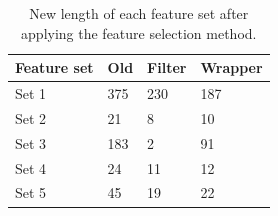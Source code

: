 \documentclass[USenglish]{ifimaster}  %
\begin{document}
\begin{table}[h]
	\centering
	\begin{tabular}{llll}
		\hline
		\textbf{Feature set} & \textbf{Old} & \textbf{Filter} & \textbf{Wrapper} \\ \hline
		Set 1 & 375 & 230 & 187 \\
		Set 2 & 21 & 8 & 10 \\
		Set 3 & 183 & 2 & 91 \\
		Set 4 & 24 & 11 & 12 \\
		Set 5 & 45 & 19 & 22 \\ \hline
	\end{tabular}
	\caption[Results of lengths of feature vector after the feature selection method]{New length of each feature set after applying the feature selection method.}
	\label{tab:exp2_1}
\end{table}
\FloatBarrier
\end{document}
